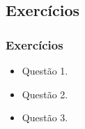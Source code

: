 \subsection[Exercícios]{Exercícios}\label{subsec:tema05-exercicios}



\begin{frame}[t]\frametitle{Exercícios}

\begin{itemize}
  \justifying{}
  \setlength\itemsep{1em}
  \item Questão 1.
  \item Questão 2.
  \item Questão 3.
\end{itemize}

\end{frame}
